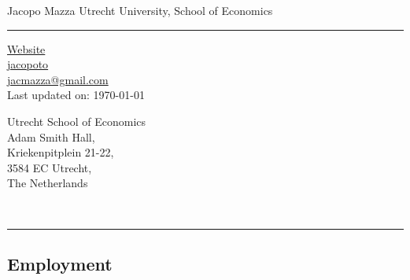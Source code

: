 \documentclass[11pt]{article}
\begin{document}
\begin{center}
\Large \sc Jacopo Mazza \hfill Utrecht University, School of Economics \\
\end{center}
\vspace{-.3cm}
\noindent\rule{\textwidth}{1pt}
\parbox[t]{.45\textwidth}{\begin{flushleft}
    \vspace{-.5cm}
    \begin{footnotesize}
    \href{https://sites.google.com/site/jacmazza}{\faGlobe\enspace Website} \\
    \href{github.com/jacopoto} {\faGithub\enspace jacopoto} \\
    \href{mailto:jacmazza@gmail.com}{\faEnvelopeO\enspace jacmazza@gmail.com} \\
    \vspace{.35cm}
    Last updated on: \today \\
    \end{footnotesize}
\end{flushleft}} \hfill
\parbox[t]{.45\textwidth}{\begin{flushright}
    \begin{footnotesize}
    \vspace{-.5cm}
    Utrecht School of Economics \\
    Adam Smith Hall, \\
    Kriekenpitplein 21-22, \\
    3584 EC Utrecht, \\
    The Netherlands \\
    \end{footnotesize}
\end{flushright}} \\
\noindent\rule{\textwidth}{1pt}

\subsection*{\sc Employment}
\end{document}
